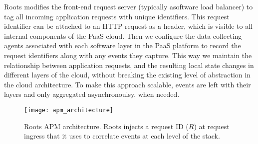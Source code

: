 Roots modifies the front-end request server (typically asoftware load
balancer) 
to tag all incoming application requests with unique identifiers.
This request identifier can be attached to an HTTP request as a header, which is visible to all 
internal components of the PaaS cloud. Then we configure the data collecting
agents associated with each software layer in the PaaS 
platform to record the request identifiers along with any events they capture. 
This way we maintain the relationship between application requests, and the resulting
local state changes in different layers of the cloud, without breaking the existing level
of abstraction in the cloud architecture. 
To make this approach scalable, events are left with their layers and only
aggregated asynchronoulsy, when needed.
%
%
\begin{figure}
\centering
\texttt{[image: apm\_architecture]}
\caption{Roots APM architecture.  Roots injects a request ID ($R$) at request
ingress that it uses to correlate events at each level of the stack.}
\label{fig:apm_architecture}
\end{figure}
%

